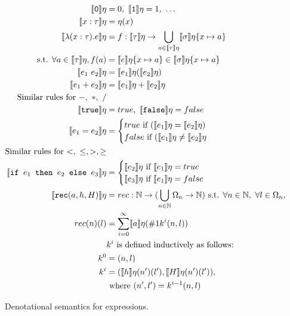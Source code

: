  \begin{figure}
 \begin{align*}
 \llbracket \texttt{0} \rrbracket\eta &= 0, \  \llbracket \texttt{1} \rrbracket\eta = 1, \ \ldots \\
  \llbracket x : \tau \rrbracket\eta &= \eta(x) \\
  \llbracket \lambda (x : \tau) . e \rrbracket\eta &= f : \llbracket \tau \rrbracket\eta 
  \rightarrow \bigcup_{a \in \llbracket \tau \rrbracket\eta} \llbracket \sigma \rrbracket\eta\{x\mapsto a\} \\
\text{ s.t. } \forall a \in \llbracket \tau \rrbracket\eta, f(a) &= \llbracket e \rrbracket\eta\{ x \mapsto a \} 
  \in \llbracket \sigma \rrbracket\eta\{x\mapsto a\}\\
 \llbracket e_1 \ e_2 \rrbracket \eta &= \llbracket e_1 \rrbracket\eta ( \llbracket e_2 \rrbracket\eta ) \\
 \llbracket e_1 + e_2 \rrbracket\eta &= \llbracket e_1 \rrbracket\eta + \llbracket e_2 \rrbracket\eta \\
\text{Similar rules for $-, \ *, \ /$} \\
  \llbracket \texttt{true} \rrbracket\eta &= true, \ \llbracket \texttt{false} \rrbracket\eta = false \\
 \llbracket e_1 = e_2 \rrbracket\eta &= 
 \begin{cases} 
      true \text{ if } (\llbracket e_1 \rrbracket\eta = \llbracket e_2 \rrbracket\eta) \\
      false \text{  if } (\llbracket e_1 \rrbracket\eta \neq \llbracket e_2\rrbracket\eta\\
   \end{cases} \\
\text{Similar rules for $<, \ \leq, >, \geq$} \\
  \llbracket \ifelse{e_1}{e_2}{e_3} \rrbracket \eta &= 
 \begin{cases} 
      \llbracket e_2 \rrbracket\eta \text{ if } \llbracket e_1 \rrbracket\eta = true \\
      \llbracket e_3 \rrbracket\eta \text{ if } \llbracket e_1 \rrbracket\eta = false \\ 
   \end{cases}
  \\
    \llbracket  \texttt{rec} (a, h, H) \rrbracket\eta &= rec: \N \rightarrow 
    (\bigcup_{n\in \N} \Omega_n \rightarrow \N) \text{ s.t. } \forall n \in \N, \ 
    \forall l \in \Omega_n, \\
    rec(n)(l) &= \sum_{i=0}^{\infty} \llbracket a \rrbracket\eta(\#1k^i(n,l)) \\
    &k^i \text{ is defined inductively as follows:} \\
    k^0 &= (n, l) \\
    k^i &= (\llbracket h \rrbracket\eta (n') (l'), \llbracket H \rrbracket\eta (n') (l')), \\
    &\text{ where } (n',l') = k^{i-1}(n, l) 
 \end{align*}
 \caption{Denotational semantics for expressions.}
 \end{figure}

